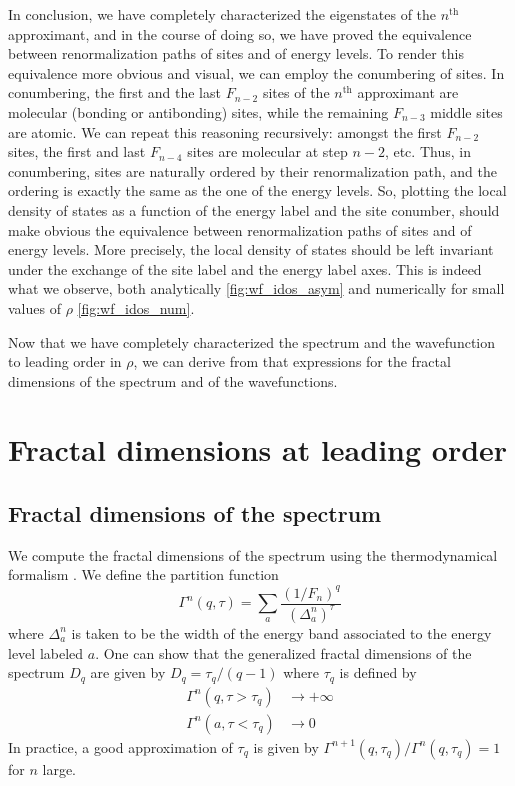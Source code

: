 \documentclass[aps,prl,preprint]{revtex4-1}
\begin{document}
In conclusion, we have completely characterized the eigenstates of the $n^\text{th}$ approximant, and in the course of doing so, we have proved the equivalence between renormalization paths of sites and of energy levels.
To render this equivalence more obvious and visual, we can employ the conumbering of sites.
In conumbering, the first and the last $F_{n-2}$ sites of the $n^\text{th}$ approximant are molecular (bonding or antibonding) sites, while the remaining $F_{n-3}$ middle sites are atomic. 
We can repeat this reasoning recursively: amongst the first $F_{n-2}$ sites, the first and last $F_{n-4}$ sites are molecular at step $n-2$, etc. 
Thus, in conumbering, sites are naturally ordered by their renormalization path, and the ordering is exactly the same as the one of the energy levels.
So, plotting the local density of states as a function of the energy label and the site conumber, should make obvious the equivalence between renormalization paths of sites and of energy levels.
More precisely, the local density of states should be left invariant under the exchange of the site label and the energy label axes. This is indeed what we observe, both analytically \eqref{fig:wf_idos_asym} and numerically for small values of $\rho$ \eqref{fig:wf_idos_num}.

Now that we have completely characterized the spectrum and the wavefunction to leading order in $\rho$, we can derive from that expressions for the fractal dimensions of the spectrum and of the wavefunctions.

\section{Fractal dimensions at leading order}

\subsection{Fractal dimensions of the spectrum}

We compute the fractal dimensions of the spectrum using the thermodynamical formalism \cite{Halsey1986}. We define the partition function
\begin{equation}
	\label{eq:gamma_spec}
	\Gamma^n(q,\tau) = \sum_{a} \frac{\left( 1/F_n \right)^q}{(\Delta_a^n)^\tau}
\end{equation}
where $\Delta_a^n$ is taken to be the width of the energy band associated to the energy level labeled $a$.
One can show \cite{Halsey1986} that the generalized fractal dimensions of the spectrum $D_q$ are given by $D_q = \tau_q/(q-1)$ where $\tau_q$ is defined by
\begin{align}
	\Gamma^n(q,\tau > \tau_q) &\rightarrow +\infty \\
	\Gamma^n(a,\tau < \tau_q) &\rightarrow 0
\end{align}
In practice, a good approximation of $\tau_q$ is given by $\Gamma^{n+1}(q,\tau_q)/\Gamma^n(q,\tau_q) = 1$ for $n$ large.
\end{document}
